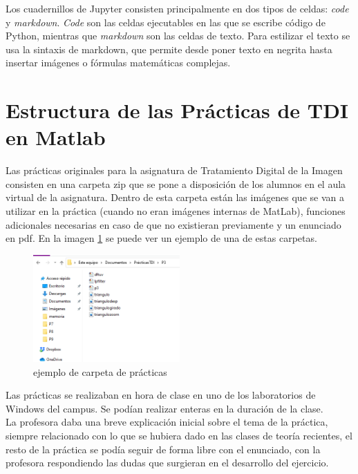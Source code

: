 \documentclass[a4paper,12pt]{report}
\begin{document}
Los cuadernillos de Jupyter consisten principalmente en dos tipos de celdas: \emph{code} y \emph{markdown}.\emph{ Code }son las celdas ejecutables en las que se escribe código de Python, mientras que \emph{markdown} son las celdas de texto. Para estilizar el texto se usa  la sintaxis de markdown, que permite desde poner texto en negrita hasta insertar imágenes o fórmulas matemáticas complejas.\\




\section{Estructura de las Prácticas de TDI en Matlab}


Las prácticas originales para la asignatura de Tratamiento Digital de la Imagen consisten en una carpeta zip que se pone a disposición de los alumnos en el aula virtual de la asignatura. Dentro de esta carpeta están las imágenes que se van a utilizar en la práctica (cuando no eran imágenes internas de MatLab), funciones adicionales necesarias en caso de que no existieran previamente y un enunciado en pdf. En la imagen \ref{carpetapracticas} se puede ver un ejemplo de una de estas carpetas.
 
\begin{figure}[h]
\centering
\includegraphics[width=0.5\textwidth]{imagenes/carpetapracticas}
\caption{ejemplo de carpeta de prácticas}
\label{carpetapracticas}
\end{figure}

Las prácticas se realizaban en hora de clase en uno de los laboratorios de Windows del campus. Se podían realizar enteras en la duración de la clase. \\

La profesora daba una breve explicación inicial sobre el tema de la práctica, siempre relacionado con lo que se hubiera dado en las clases de teoría recientes, el resto de la práctica se podía seguir de forma libre con el enunciado, con la profesora respondiendo las dudas que surgieran en el desarrollo del ejercicio. \\
\end{document}
